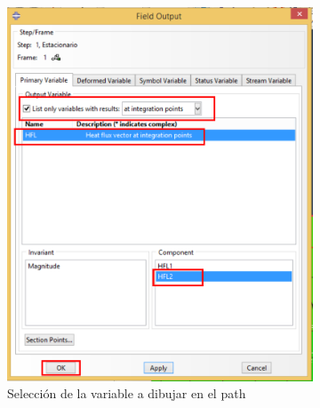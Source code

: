 \begin{itemize}
\begin{figure}[!h]
    \begin{subfigure}[!h]{0.60\textwidth}
      \includegraphics[width=\textwidth]{./body/images/post14.pdf}
      \caption{Selección de la variable a dibujar en el path}
      \label{post14}
    \end{subfigure}%
    \begin{subfigure}[!h]{0.40\textwidth}

\end{subfigure}
\end{figure}
\end{itemize}
